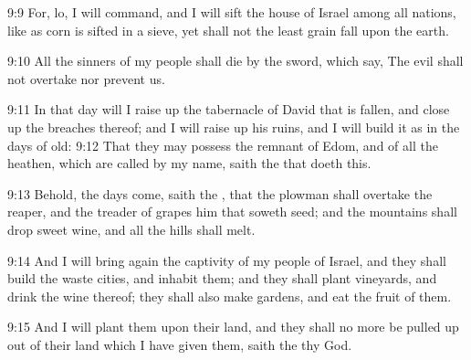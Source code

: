 9:9 For, lo, I will command, and I will sift the house of Israel among
all nations, like as corn is sifted in a sieve, yet shall not the
least grain fall upon the earth.

9:10 All the sinners of my people shall die by the sword, which say,
The evil shall not overtake nor prevent us.

9:11 In that day will I raise up the tabernacle of David that is
fallen, and close up the breaches thereof; and I will raise up his
ruins, and I will build it as in the days of old: 9:12 That they may
possess the remnant of Edom, and of all the heathen, which are called
by my name, saith the \LORD that doeth this.

9:13 Behold, the days come, saith the \LORD, that the plowman shall
overtake the reaper, and the treader of grapes him that soweth seed;
and the mountains shall drop sweet wine, and all the hills shall melt.

9:14 And I will bring again the captivity of my people of Israel, and
they shall build the waste cities, and inhabit them; and they shall
plant vineyards, and drink the wine thereof; they shall also make
gardens, and eat the fruit of them.

9:15 And I will plant them upon their land, and they shall no more be
pulled up out of their land which I have given them, saith the \LORD
thy God.

